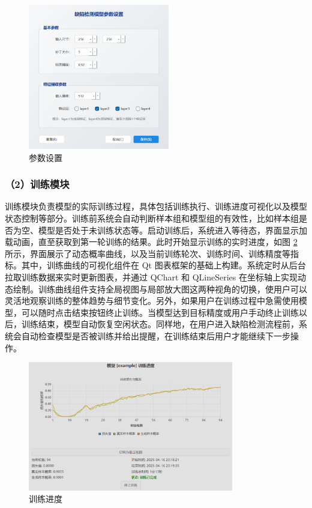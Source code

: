 \documentclass[
  ]{njuthesis}
\begin{document}
\begin{figure}[htb]
    \centering
    \includegraphics[width=0.55\textwidth]{images/参数设置.png}
    \caption{参数设置}
    \label{参数设置}
\end{figure}

\subsubsection{（2）训练模块}

训练模块负责模型的实际训练过程，具体包括训练执行、训练进度可视化以及模型状态控制等部分。训练前系统会自动判断样本组和模型组的有效性，比如样本组是否为空、模型是否处于未训练状态等。启动训练后，系统进入等待态，界面显示加载动画，直至获取到第一轮训练的结果。此时开始显示训练的实时进度，如图 \ref{训练进度} 所示，界面展示了动态概率曲线，以及当前训练轮次、训练时间、训练精度等指标。其中，训练曲线的可视化组件在 Qt 图表框架的基础上构建。系统定时从后台拉取训练数据来实时更新图表，并通过 QChart 和 QLineSeries 在坐标轴上实现动态绘制。训练曲线组件支持全局视图与局部放大图这两种视角的切换，使用户可以灵活地观察训练的整体趋势与细节变化。另外，如果用户在训练过程中急需使用模型，可以随时点击结束按钮终止训练。当模型达到目标精度或用户手动终止训练以后，训练结束，模型自动恢复空闲状态。同样地，在用户进入缺陷检测流程前，系统会自动检查模型是否被训练并给出提醒，在训练结束后用户才能继续下一步操作。

\begin{figure}[htb]
    \centering
    \includegraphics[width=0.80\textwidth]{images/训练进度.png}
    \caption{训练进度}
    \label{训练进度}
\end{figure}
\end{document}
